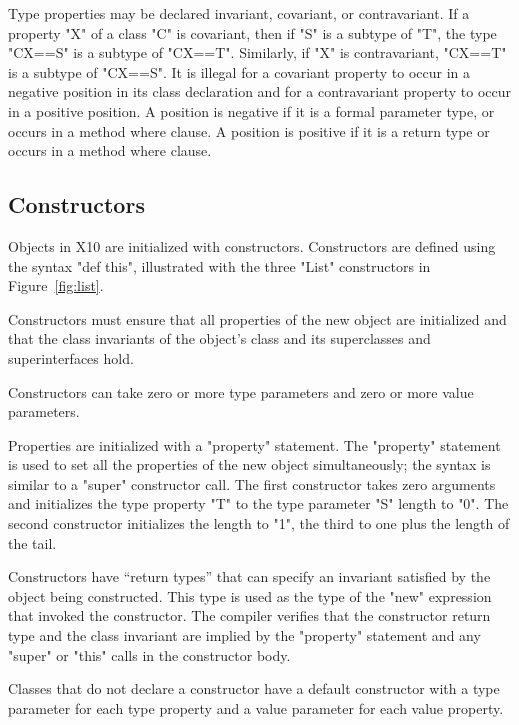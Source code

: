 \documentclass[preprint,nocopyrightspace,9pt]{sigplanconf}
\begin{document}
Type properties may be declared invariant, covariant, or
contravariant.
If a property \xcd"X" of a class \xcd"C" is covariant,
then if \xcd"S" is a subtype of
\xcd"T", the type \xcd"C{X==S}" is a subtype of \xcd"C{X==T}".
Similarly, if \xcd"X" is contravariant, 
                  \xcd"C{X==T}" is a subtype of \xcd"C{X==S}".
It is illegal for a covariant property to occur in a negative
position in its class declaration and for a contravariant
property to occur in a positive position.  A position is
negative if it is a formal parameter type, or occurs in a method
where clause.  A position is positive if it is a return type or
occurs in a method where clause.

\subsection{Constructors}

Objects in X10 are initialized with constructors. 
Constructors are defined using the syntax \xcd"def this",
illustrated with the three \xcd"List"
constructors in Figure~\ref{fig:list}.

Constructors must ensure that all properties of the new object
are initialized and that the class invariants of the object's
class and its superclasses and superinterfaces hold.

Constructors can take zero or more type parameters and zero or
more value parameters.

Properties are initialized with a \xcd"property" statement.
The \xcd"property" statement is used to set all the properties
of the new object simultaneously; the syntax is similar to a \xcd"super"
constructor call.
The first constructor takes zero arguments and initializes the
type property \xcd"T" to the type parameter \xcd"S"
length to \xcd"0".  The second constructor initializes the
length to \xcd"1", the third to one plus the length of the tail.

Constructors have ``return
types'' that can specify an invariant satisfied by the object being
constructed.  This type 
is used as the type of the \xcd"new" expression that
invoked the constructor.
The compiler verifies that the
constructor return type and the class invariant are implied by the
\xcd"property" statement and any \xcd"super"
or \xcd"this" calls in the constructor body.

Classes that do not declare a constructor
have a default constructor with a type parameter for each
type property and a value parameter for each value property.
\end{document}
